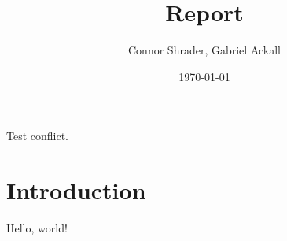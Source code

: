 \documentclass{article}
\title{Report}
\author{Connor Shrader, Gabriel Ackall}
\date{\today}
\begin{document}
Test conflict.

\maketitle

\section{Introduction}
Hello, world!
\end{document}
